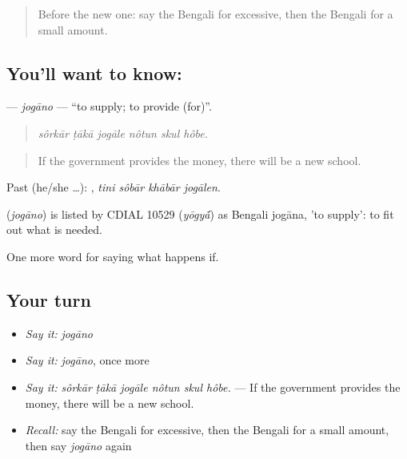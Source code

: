 \begin{quote}
Before the new one: say the Bengali for excessive, then the Bengali for a small amount.
\end{quote}

\subsection*{You'll want to know: }
\textbf{} — \emph{jogāno} — \textquotedblleft{}to supply; to provide (for)\textquotedblright{}.

\begin{quote}
     
\end{quote}

\begin{quote}
\emph{sôrkār ṭākā jogāle nôtun skul hôbe.}
\end{quote}

\begin{quote}
If the government provides the money, there will be a new school.
\end{quote}

Past (he/she …):    , \emph{tini sôbār khābār jogālen}.

\begin{cousinweb}
\textbf{} (\emph{jogāno}) is listed by CDIAL 10529 (\emph{yōgy\'{\={a}}}) as Bengali jogāna, 'to supply': to fit out what is needed.
\end{cousinweb}

\begin{grammarlens}[title={What you've built}]
One more word for saying what happens if.
\end{grammarlens}

\subsection*{Your turn}
\begin{itemize}
\raggedright
  \item \emph{Say it:} \emph{jogāno}
  \item \emph{Say it:} \emph{jogāno}, once more
  \item \emph{Say it:} \emph{sôrkār ṭākā jogāle nôtun skul hôbe.} — If the government provides the money, there will be a new school.
  \item \emph{Recall:} say the Bengali for excessive, then the Bengali for a small amount, then say \emph{jogāno} again
\end{itemize}

